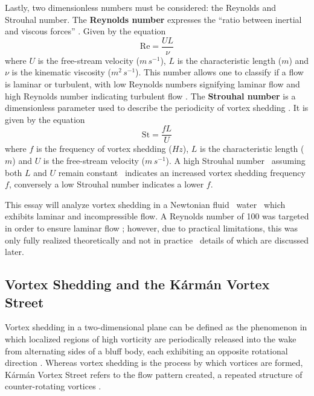 Lastly, two dimensionless numbers must be considered: the Reynolds and Strouhal number. The \textbf{Reynolds number} expresses the “ratio between inertial and viscous forces” \parencite{nasa_reynolds, noauthor_relationship_nodate}. Given by the equation 
\begin{equation}
	\mathrm{Re} = \frac{U L}{\nu}
	\label{eq:reynoldsNumber}
\end{equation}
where $U$ is the free-stream velocity ($m\,s^{-1}$), $L$ is the characteristic length ($m$) and $\nu$ is the kinematic viscosity ($m^2\,s^{-1}$). This number allows one to classify if a flow is laminar or turbulent, with low Reynolds numbers signifying laminar flow and high Reynolds number indicating turbulent flow \parencite{saldana2024_reynolds}. The \textbf{Strouhal number} is a dimensionless parameter used to describe the periodicity of vortex shedding \parencite[p.~211]{choi2000strouhal}. It is given by the equation 
\begin{equation}
	\mathrm{St} = \frac{f L}{U}
	\label{eq:strouhalNumber}
\end{equation}
where $f$ is the frequency of vortex shedding ($Hz$), $L$ is the characteristic length ($m$) and $U$ is the free-stream velocity ($m\,s^{-1}$). A high Strouhal number \textemdash\ assuming both $L$ and $U$ remain constant \textemdash\ indicates an increased vortex shedding frequency $f$, conversely a low Strouhal number indicates a lower $f$.

This essay will analyze vortex shedding in a Newtonian fluid \textemdash\ water \textemdash\ which exhibits laminar and incompressible flow. A Reynolds number of 100 was targeted in order to ensure laminar flow \parencite[2]{alammar_wake_nodate}; however, due to practical limitations, this was only fully realized theoretically and not in practice \textemdash\ details of which are discussed later.

\subsection{Vortex Shedding and the Kármán Vortex Street}
Vortex shedding in a two-dimensional plane can be defined as the phenomenon in which localized regions of high vorticity are periodically released into the wake from alternating sides of a bluff body, each exhibiting an opposite rotational direction \parencite[156]{green1995fluid}. Whereas vortex shedding is the process by which vortices are formed, Kármán Vortex Street refers to the flow pattern created, a repeated structure of counter-rotating vortices \parencite[26]{govardhan2005karman}.

